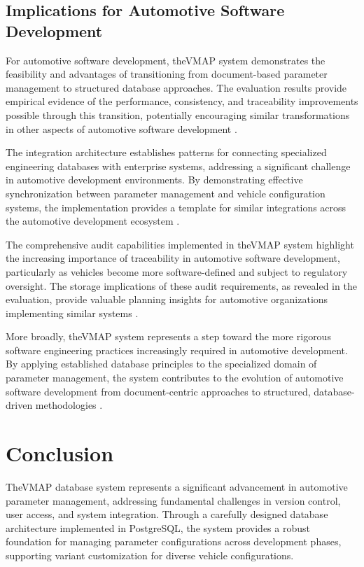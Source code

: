 \subsection{Implications for Automotive Software Development}
\label{subsec:automotive-development-implications}

For automotive software development, the\ac{VMAP} system demonstrates the feasibility and advantages of transitioning from document-based parameter management to structured database approaches. The evaluation results provide empirical evidence of the performance, consistency, and traceability improvements possible through this transition, potentially encouraging similar transformations in other aspects of automotive software development \cite{broy2006challenges}.

The integration architecture establishes patterns for connecting specialized engineering databases with enterprise systems, addressing a significant challenge in automotive development environments. By demonstrating effective synchronization between parameter management and vehicle configuration systems, the implementation provides a template for similar integrations across the automotive development ecosystem \cite{hohpe2002enterprise}.

The comprehensive audit capabilities implemented in the\ac{VMAP} system highlight the increasing importance of traceability in automotive software development, particularly as vehicles become more software-defined and subject to regulatory oversight. The storage implications of these audit requirements, as revealed in the evaluation, provide valuable planning insights for automotive organizations implementing similar systems \cite{staron2021automotive}.

More broadly, the\ac{VMAP} system represents a step toward the more rigorous software engineering practices increasingly required in automotive development. By applying established database principles to the specialized domain of parameter management, the system contributes to the evolution of automotive software development from document-centric approaches to structured, database-driven methodologies \cite{pretschner2007software}.

\section{Conclusion}
\label{sec:final-conclusion}

The\ac{VMAP} database system represents a significant advancement in automotive parameter management, addressing fundamental challenges in version control, user access, and system integration. Through a carefully designed database architecture implemented in PostgreSQL, the system provides a robust foundation for managing parameter configurations across development phases, supporting variant customization for diverse vehicle configurations.

